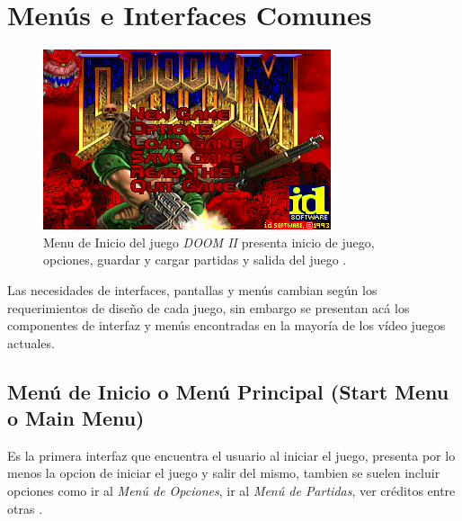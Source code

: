 \section{Menús e Interfaces Comunes}
\setlength\intextsep{0pt}
\begin{figure}
\includegraphics[width=\linewidth]{semana8/doom_start.png} 
\caption{Menu de Inicio del juego \emph{DOOM II} presenta inicio de juego, opciones, guardar y cargar partidas y salida del juego \cite{doomii}.}
\end{figure}
Las necesidades de interfaces, pantallas y menús cambian según los requerimientos de diseño de cada juego, sin embargo se presentan acá los componentes de interfaz y menús encontradas en la mayoría de los vídeo juegos actuales.
\subsection{Menú de Inicio o Menú Principal (Start Menu o Main Menu)}
Es la primera interfaz que encuentra el usuario al iniciar el juego, presenta por lo menos la opcion de iniciar el juego y salir del mismo, tambien se suelen incluir opciones como ir al \emph{Menú de Opciones}, ir al \emph{Menú de Partidas}, ver créditos entre otras \cite{mainmenu}.
